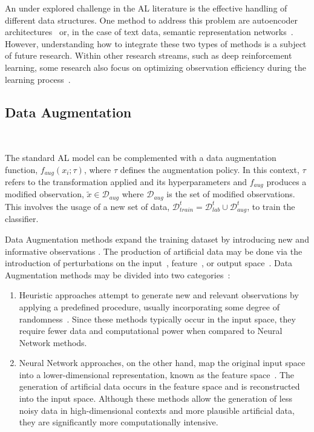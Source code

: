 An under explored challenge in the AL literature is the effective handling of
different data structures. One method to address this problem are autoencoder
architectures~\cite{li2017grass} or, in the case of text data, semantic
representation networks~\cite{zheng2021sentence}. However, understanding
how to integrate these two types of methods is a subject of future research.
Within other research streams, such as deep reinforcement learning, some
research also focus on optimizing observation efficiency during the learning
process~\cite{zhang2022training}.


\subsection{Data Augmentation}~\label{sec:data_augmentation-al-aug}

The standard AL model can be complemented with a data augmentation function,
$f_{aug}(x_i;\tau)$, where $\tau$ defines the augmentation policy. In this
context, $\tau$ refers to the transformation applied and its hyperparameters
and $f_{aug}$ produces a modified observation, $\tilde{x} \in
\mathcal{D}_{aug}$ where $\mathcal{D}_{aug}$ is the set of modified
observations. This involves the usage of a new set of data,
$\mathcal{D}_{train}^t = \mathcal{D}_{lab}^t \cup \mathcal{D}_{aug}^t$, to
train the classifier.

Data Augmentation methods expand the training dataset by introducing new and
informative observations \cite{Behpour2019}. The production of artificial data
may be done via the introduction of perturbations on the
input~\cite{Fonseca2021}, feature~\cite{DeVries2017}, or output
space~\cite{Behpour2019}. Data Augmentation methods may be divided into two
categories~\cite{Shorten2019}:

\begin{enumerate}
    \item Heuristic approaches attempt to generate new and relevant
        observations by applying a predefined procedure, usually incorporating
        some degree of randomness~\cite{Kashefi2020}. Since these methods
        typically occur in the input space, they require fewer data and
        computational power when compared to Neural Network methods. 
    \item Neural Network approaches, on the other hand, map the original input
        space into a lower-dimensional representation, known as the feature
        space~\cite{DeVries2017}. The generation of artificial data occurs in
        the feature space and is reconstructed into the input space. Although
        these methods allow the generation of less noisy data in
        high-dimensional contexts and more plausible artificial data, they are
        significantly more computationally intensive. 
\end{enumerate}

